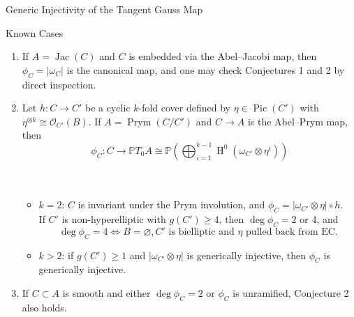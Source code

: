 \documentclass[final]{beamer}
\numberwithin{equation}{section}
\theoremstyle{plain}
\newlength{\colwidth}
\DeclareMathOperator{\Pic}{\operatorname{Pic}}
\DeclareMathOperator{\Jac}{\operatorname{Jac}}
\DeclareMathOperator{\Prym}{\operatorname{Prym}}
\DeclareMathOperator{\Hnm}{\operatorname{H}}
\begin{document}
\begin{frame}[t]
\begin{columns}[t]
\begin{column}{\colwidth}
\begin{block}{Generic Injectivity of the Tangent Gauss Map}
  \end{block}
  \begin{block}{Known Cases}
  \begin{enumerate}
  \item
  If $A=\Jac(C)$ and $C$ is embedded via the Abel--Jacobi map, then $\phi_C=|\omega_C|$ is the canonical map, and one may check Conjectures 1 and 2 by direct inspection.
  
  \item Let $h:C \longrightarrow C'$ be a cyclic $k$-fold cover defined by $\eta \in \Pic(C')$ with $\eta^{\otimes k} \cong \mathcal{O}_{C'}(B)$. If $A = \Prym(C/C')$ and $C \to A$ is the Abel--Prym map, then
  $$\phi_C: C \longrightarrow \mathbb{P} T_0A \cong \mathbb{P} \left( \bigoplus_{i=1}^{k-1} \Hnm^0(\omega_{C'} \otimes \eta^i)  \right)$$
  $\;$\\[-20mm] $\,$
  \begin{itemize}
  \item $k=2$: $C$ is invariant under the Prym involution, and $\phi_C=|\omega_{C'} \otimes \eta| \circ h$.\\
  If $C'$ is non-hyperelliptic with $g(C') \geq 4$, then $\deg \phi_C = 2$ or $4$, and
  $$\deg \phi_C=4 \Longleftrightarrow B=\varnothing, C' \text{ is bielliptic and $\eta$ pulled back from EC.}$$
  \item $k>2$: if $g(C') \geq 1$ and $|\omega_{C'} \otimes \eta|$ is generically injective, then $\phi_C$ is generically injective.
  \end{itemize}
  
\item If $C \subset A$ is smooth and either $\deg \phi_C = 2$ or $\phi_C$ is unramified, Conjecture 2 also holds.
  \end{enumerate}
  \end{block}



\end{column}


\end{columns}
\end{frame}
\end{document}
